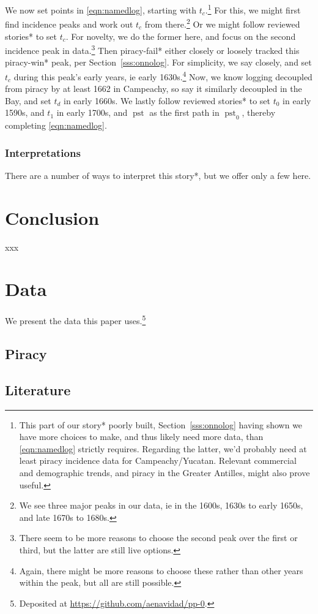 \documentclass{amsart}
\DeclareMathOperator{\pst}{pst} %
\theoremstyle{definition}
\theoremstyle{remark}
\begin{document}
		We now set points in \ref{eqn:namedlog}, starting with \(t_c\).\footnote{This part of our story* poorly built, Section~\ref{sss:onnolog} having shown we have more choices to make, and thus likely need more data, than \ref{eqn:namedlog} strictly requires. Regarding the latter, we'd probably need at least piracy incidence data for Campeachy/Yucatan. Relevant commercial and demographic trends, and piracy in the Greater Antilles, might also prove useful.} For this, we might first find incidence peaks and work out \(t_c\) from there.\footnote{We see three major peaks in our data, ie in the 1600s, 1630s to early 1650s, and late 1670s to 1680s.} Or we might follow reviewed stories* to set \(t_c\). For novelty, we do the former here, and focus on the second incidence peak in data.\footnote{There seem to be more reasons to choose the second peak over the first or third, but the latter are still live options.} Then piracy-fail* either closely or loosely tracked this piracy-win* peak, per Section~\ref{sss:onnolog}. For simplicity, we say closely, and set \(t_c\) during this peak's early years, ie early 1630s.\footnote{Again, there might be more reasons to choose these rather than other years within the peak, but all are still possible.} Now, we know logging decoupled from piracy by at least 1662 in Campeachy, so say it similarly decoupled in the Bay, and set \(t_d\) in early 1660s. We lastly follow reviewed stories* to set \(t_0\) in early 1590s, and \(t_1\) in early 1700s, and \(\pst\) as the first path in \(\pst_0\), thereby completing \ref{eqn:namedlog}.
		\subsubsection{Interpretations}
		\label{sss:storyinterpret}
		There are a number of ways to interpret this story*, but we offer only a few here.
%
%
%
\section{Conclusion}
\label{s:concl}
	xxx 
%
%
%
\section{Data}
\label{s:data}
	We present the data this paper uses.\footnote{Deposited at \url{https://github.com/aenavidad/pp-0}.}
	\subsection{Piracy}
	\label{ss:datapiracy}
	\subsection{Literature}
	\label{ss:dataliterature}
%
%
%
%
\begin{bibdiv}
\label{s:references}
	\begin{biblist}
	\end{biblist}
\end{bibdiv}
%
%
%
\end{document}
